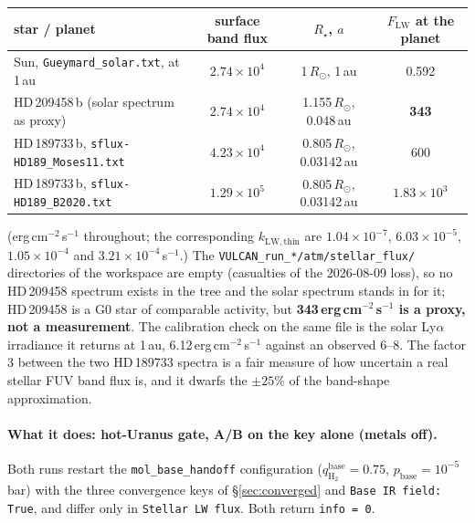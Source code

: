 \documentclass[english,a4paper]{my_memo}
\newcommand{\qHH}{q_{\mathrm{H_2}}}
\begin{document}
\begin{center}\small
\begin{tabular}{@{}lccc@{}}
\toprule
star / planet & surface band flux & $R_\star$, $a$ & $F_\mathrm{LW}$ at the planet \\
\midrule
Sun, \texttt{Gueymard\_solar.txt}, at 1\,au & $2.74\times10^{4}$ & 1\,$R_\odot$, 1\,au & 0.592 \\
HD\,209458\,b (solar spectrum as proxy) & $2.74\times10^{4}$ & 1.155\,$R_\odot$, 0.048\,au & \textbf{343} \\
HD\,189733\,b, \texttt{sflux-HD189\_Moses11.txt} & $4.23\times10^{4}$ & 0.805\,$R_\odot$, 0.03142\,au & 600 \\
HD\,189733\,b, \texttt{sflux-HD189\_B2020.txt} & $1.29\times10^{5}$ & 0.805\,$R_\odot$, 0.03142\,au & $1.83\times10^{3}$ \\
\bottomrule
\end{tabular}
\end{center}

\noindent (erg\,cm$^{-2}$\,s$^{-1}$ throughout; the corresponding
$k_\mathrm{LW,thin}$ are $1.04\times10^{-7}$, $6.03\times10^{-5}$,
$1.05\times10^{-4}$ and $3.21\times10^{-4}$\,s$^{-1}$.) The
\texttt{VULCAN\_run\_*/atm/stellar\_flux/} directories of the workspace are empty
(casualties of the 2026-08-09 loss), so no HD\,209458 spectrum exists in the
tree and the solar spectrum stands in for it; HD\,209458 is a G0 star of
comparable activity, but \textbf{343\,erg\,cm$^{-2}$\,s$^{-1}$ is a proxy, not a
measurement}. The calibration check on the same file is the solar Ly$\alpha$
irradiance it returns at 1\,au, 6.12\,erg\,cm$^{-2}$\,s$^{-1}$ against an observed
6--8. The factor 3 between the two HD\,189733 spectra is a fair measure of how
uncertain a real stellar FUV band flux is, and it dwarfs the $\pm25\%$ of the
band-shape approximation.

\paragraph{What it does: hot-Uranus gate, A/B on the key alone (metals off).}
Both runs restart the \texttt{mol\_base\_handoff} configuration
($\qHH^\mathrm{base}=0.75$, $p_\mathrm{base}=10^{-5}$\,bar) with the three
convergence keys of \S\ref{sec:converged} and \texttt{Base IR field: True}, and
differ only in \texttt{Stellar LW flux}. Both return \texttt{info = 0}.
\end{document}
